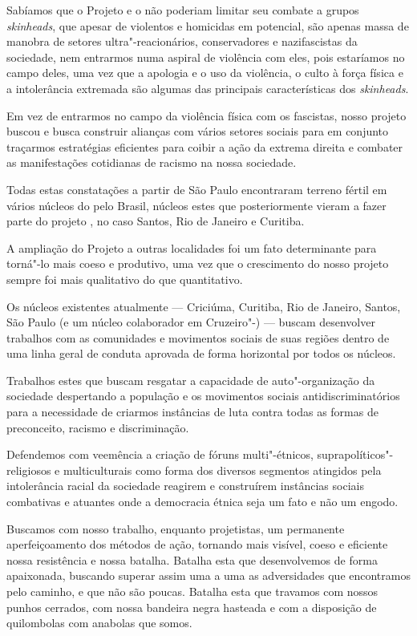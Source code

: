 Sabíamos que o Projeto  e o  não poderiam limitar seu combate a grupos \emph{skinheads}, que apesar de violentos e homicidas em potencial, são apenas massa de manobra de setores ultra"-reacionários, conservadores e nazifascistas da sociedade, nem entrarmos numa aspiral de violência com eles, pois estaríamos no campo deles, uma vez que a apologia e o uso da violência, o culto à força física e a intolerância extremada são algumas das principais características dos \emph{skinheads}.

Em vez de entrarmos no campo da violência física com os fascistas, nosso projeto buscou e busca construir alianças com vários setores sociais para em conjunto traçarmos estratégias eficientes para coibir a ação da extrema direita e combater as manifestações cotidianas de racismo na nossa sociedade.

Todas estas constatações a partir de São Paulo encontraram terreno fértil em vários núcleos do  pelo Brasil, núcleos estes que posteriormente vieram a fazer parte do projeto , no caso Santos, Rio de Janeiro e Curitiba.

A ampliação do Projeto  a outras localidades foi um fato determinante para torná"-lo mais coeso e produtivo, uma vez que o crescimento do nosso projeto sempre foi mais qualitativo do que quantitativo.

Os núcleos existentes atualmente --- Criciúma, Curitiba, Rio de Janeiro, Santos, São Paulo (e um núcleo colaborador em Cruzeiro"-) --- buscam desenvolver trabalhos com as comunidades e movimentos sociais de suas regiões dentro de uma linha geral de conduta aprovada de forma horizontal por todos os núcleos.

Trabalhos estes que buscam resgatar a capacidade de auto"-organização da sociedade despertando a população e os movimentos sociais antidiscriminatórios para a necessidade de criarmos instâncias de luta contra todas as formas de preconceito, racismo e discriminação.

Defendemos com veemência a criação de fóruns multi"-étnicos, suprapolíticos"-religiosos e multiculturais como forma dos diversos segmentos atingidos pela intolerância racial da sociedade reagirem e construírem instâncias sociais combativas e atuantes onde a democracia étnica seja um fato e não um engodo.

Buscamos com nosso trabalho, enquanto projetistas, um permanente aperfeiçoamento dos métodos de ação, tornando mais visível, coeso e eficiente nossa resistência e nossa batalha.
Batalha esta que desenvolvemos de forma apaixonada, buscando superar assim uma a uma as adversidades que encontramos pelo caminho, e que não são poucas.
Batalha esta que travamos com nossos punhos cerrados, com nossa bandeira negra hasteada e com a disposição de quilombolas com anabolas que somos.\enlargethispage{\baselineskip}

